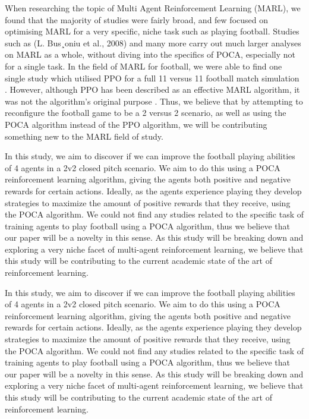 \documentclass{LSkill}
\begin{document}
When researching the topic of Multi Agent Reinforcement Learning (MARL), we found that the majority of studies were fairly broad, and few focused on optimising MARL for a very specific, niche task such as playing football. Studies such as  (L. Bus¸oniu et al., 2008)\cite{busoniu2008survey} and many more carry out much larger analyses on MARL as a whole, without diving into the specifics of POCA, especially not for a single task. In the field of MARL for football, we were able to find one single study which utilised PPO for a full 11 versus 11 football match simulation \cite{smit2023scaling_marl}. However, although PPO has been described as an effective MARL algorithm, it was not the algorithm’s original purpose \cite{yu2022ppo_cooperative}. Thus, we believe that by attempting to reconfigure the football game to be a 2 versus 2 scenario, as well as using the POCA algorithm instead of the PPO algorithm, we will be contributing something new to the MARL field of study.


In this study, we aim to discover if we can improve the football playing abilities of 4 agents in a 2v2 closed pitch scenario. We aim to do this using a POCA reinforcement learning algorithm, giving the agents both positive and negative rewards for certain actions. Ideally, as the agents experience playing they develop strategies to maximize the amount of positive rewards that they receive, using the POCA algorithm. We could not find any studies related to the specific task of training agents to play football using a POCA algorithm, thus we believe that our paper will be a novelty in this sense. As this study will be breaking down and exploring a very niche facet of multi-agent reinforcement learning, we believe that this study will be contributing to the current academic state of the art of reinforcement learning. 



In this study, we aim to discover if we can improve the football playing abilities of 4 agents in a 2v2 closed pitch scenario. We aim to do this using a POCA reinforcement learning algorithm, giving the agents both positive and negative rewards for certain actions. Ideally, as the agents experience playing they develop strategies to maximize the amount of positive rewards that they receive, using the POCA algorithm. We could not find any studies related to the specific task of training agents to play football using a POCA algorithm, thus we believe that our paper will be a novelty in this sense. As this study will be breaking down and exploring a very niche facet of multi-agent reinforcement learning, we believe that this study will be contributing to the current academic state of the art of reinforcement learning. 
\end{document}
